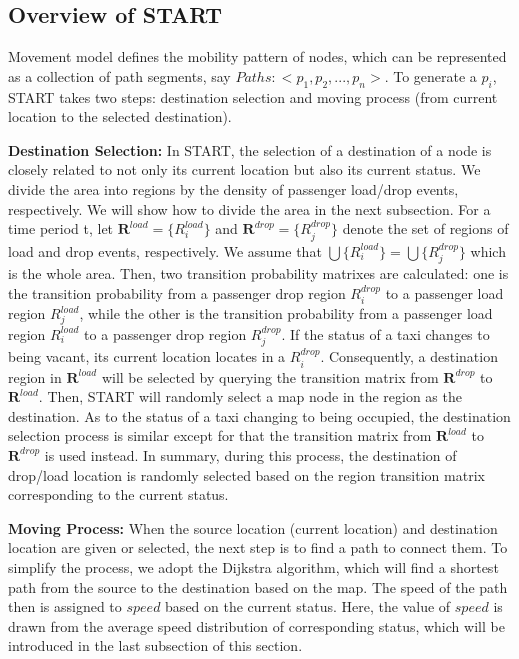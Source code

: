
\subsection{Overview of START}

Movement model defines the mobility pattern of nodes, which can be represented as a collection of path segments, say $Paths:<p_1,p_2,...,p_n>$.  To generate a $p_i$, START takes two steps: destination selection and moving process (from current location to the selected destination).

\textbf{Destination Selection:} In START, the selection of a destination of a node is closely related to not only its current location but also its current status. We divide the area into regions by the density of passenger load/drop events, respectively. We will show how to divide the area in the next subsection. For a time period t, let $\textbf{R}^{load}=\{R_i^{load}\}$ and $\textbf{R}^{drop}=\{R_j^{drop}\}$ denote the set of regions of load and drop events, respectively. We assume that $\bigcup\{R_i^{load}\}=\bigcup\{R_j^{drop}\}$ which is the whole area.
Then, two transition probability matrixes are calculated: one is the transition probability from a passenger drop region $R_i^{drop}$ to a passenger load region $R_j^{load}$, while the other is the transition probability from a passenger load region $R_i^{load}$ to a passenger drop region $R_j^{drop}$.
If the status of a taxi changes to being vacant, its current location locates in a $R_i^{drop}$. Consequently, a destination region in $\textbf{R}^{load}$ will be selected by querying the transition matrix from $\textbf{R}^{drop}$ to $\textbf{R}^{load}$. Then, START will randomly select a map node in the region as the destination. As to the status of a taxi changing to being occupied, the destination selection process is similar except for that the transition matrix from $\textbf{R}^{load}$ to $\textbf{R}^{drop}$ is used instead. In summary, during this process, the destination of drop/load location is randomly selected based on the region transition matrix corresponding to the current status.

\textbf{Moving Process:} When the source location (current location) and destination location are given or selected, the next step is to find a path to connect them. To simplify the process, we adopt the Dijkstra algorithm, which will find a shortest path from the source to the destination based on the map. The speed of the path then is assigned to $speed$ based on the current status. Here, the value of $speed$ is drawn from the average speed distribution of corresponding status, which will be introduced in the last subsection of this section.



